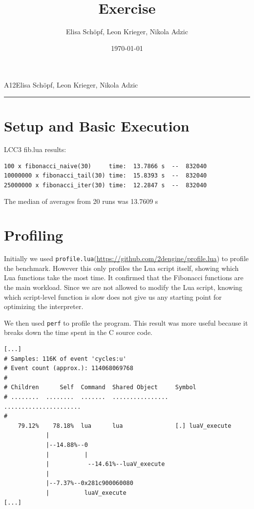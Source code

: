 \documentclass[a4paper]{article}
\title{Exercise \Abgabe}
\author{Elisa Schöpf, Leon Krieger, Nikola Adzic}
\date{\today}
\newcommand{\Abgabe}{12}
\begin{document}
\noindent \maketitle
\vspace{-1em}
\noindent A\Abgabe \hfill Elisa Schöpf, Leon Krieger, Nikola Adzic

\hrule

\tableofcontents

\section{Setup and Basic Execution}
LCC3 fib.lua results:
\begin{verbatim}
100 x fibonacci_naive(30)     time:  13.7866 s  --  832040
10000000 x fibonacci_tail(30) time:  15.8393 s  --  832040
25000000 x fibonacci_iter(30) time:  12.2847 s  --  832040
\end{verbatim}
The median of averages from 20 runs was 13.7609 s

\section{Profiling}

Initially we used \texttt{profile.lua}(\url{https://github.com/2dengine/profile.lua}) to profile the benchmark. However this only profiles the Lua script itself, showing which Lua functions take the most time. It confirmed that the Fibonacci functions are the main workload. Since we are not allowed to modify the Lua script, knowing which script-level function is slow does not give us any starting point for optimizing the interpreter.

We then used \texttt{perf} to profile the program. This result was more useful because it breaks down the time spent in the C source code.

\begin{verbatim}
[...]
# Samples: 116K of event 'cycles:u'
# Event count (approx.): 114068069768
#
# Children      Self  Command  Shared Object     Symbol                
# ........  ........  .......  ................  ......................
#
    79.12%    78.18%  lua      lua               [.] luaV_execute
            |          
            |--14.88%--0
            |          |          
            |           --14.61%--luaV_execute
            |          
            |--7.37%--0x281c900060080
            |          luaV_execute
[...]
\end{verbatim}
\end{document}
